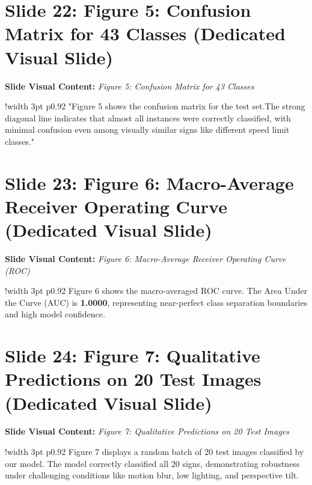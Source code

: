 \documentclass[11pt]{article}
\begin{document}
\section{Slide 22: Figure 5: Confusion Matrix for 43 Classes (Dedicated Visual Slide)}
\textbf{Slide Visual Content:} \textit{Figure 5: Confusion Matrix for 43 Classes}\\ [8pt]
\noindent
\begin{tabular}{!{\color{primary}\vrule width 3pt} p{0.92\textwidth}}
  \small\color{black!80} "Figure 5 shows the confusion matrix for the test set.\newline\newline The strong diagonal line indicates that almost all instances were correctly classified, with minimal confusion even among visually similar signs like different speed limit classes."
\end{tabular}
\vspace{15pt}

\section{Slide 23: Figure 6: Macro-Average Receiver Operating Curve (Dedicated Visual Slide)}
\textbf{Slide Visual Content:} \textit{Figure 6: Macro-Average Receiver Operating Curve (ROC)}\\ [8pt]
\noindent
\begin{tabular}{!{\color{primary}\vrule width 3pt} p{0.92\textwidth}}
  \small\color{black!80} Figure 6 shows the macro-averaged ROC curve. The Area Under the Curve (AUC) is \textbf{1.0000}, representing near-perfect class separation boundaries and high model confidence.
\end{tabular}
\vspace{15pt}

\section{Slide 24: Figure 7: Qualitative Predictions on 20 Test Images (Dedicated Visual Slide)}
\textbf{Slide Visual Content:} \textit{Figure 7: Qualitative Predictions on 20 Test Images}\\ [8pt]
\noindent
\begin{tabular}{!{\color{primary}\vrule width 3pt} p{0.92\textwidth}}
  \small\color{black!80} Figure 7 displays a random batch of 20 test images classified by our model. The model correctly classified all 20 signs, demonstrating robustness under challenging conditions like motion blur, low lighting, and perspective tilt.
\end{tabular}
\vspace{15pt}
\end{document}
